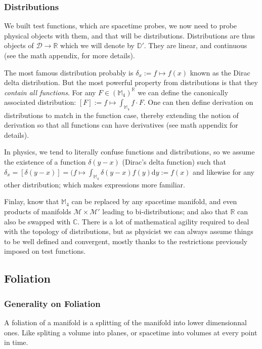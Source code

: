\documentclass[a4paper,11pt]{article}
\numberwithin{equation}{section}
\theoremstyle{definition}
\renewcommand{\d}{{\mathrm{d}}}
\begin{document}
\subsubsection{Distributions}
    We built test functions, which are spacetime probes, we now need to probe physical objects with them, and that will be distributions. Distributions are thus objects of $\mathcal{D}\to\mathbb{R}$ which we will denote by $\mathbb{D}'$. They are linear, and continuous (see the math appendix, for more details).

    The most famous distribution probably is $\delta_x:= f \mapsto f(x)$ known as the Dirac delta  distribution. 
    But the most powerful property from distributions is that they \emph{contain all functions}. For any $F\in (\mathbb{M}_4)^\mathbb{R}$ we can define the canonically associated distribution: $[F]:=f\mapsto\int_{\mathbb{M}_4} f\cdot F$. One can then define derivation on distributions to match in the function case, thereby extending the notion of derivation so that all functions can have derivatives (see math appendix for details).

    In physics, we tend to literally confuse functions and distributions, so we assume the existence of a function $\delta(y-x)$ (Dirac's delta function) such that $\delta_x=[\delta(y-x)]=(f\mapsto \int_{\mathbb{M}_4}\delta(y-x)f(y)\d y:=f(x)$ and likewise for any other distribution; which makes expressions more familiar.

    Finlay, know that $\mathbb{M}_4$ can be replaced by any spacetime manifold, and even products of manifolds $\mathcal{M}\times\mathcal{M}'$ leading to bi-distributions; and also that $\mathbb{R}$ can also be swapped with $\mathbb{C}$. There is a lot of mathematical agility required to deal with the topology of distributions, but as physicist we can always assume things to be well defined and convergent, mostly thanks to the restrictions previously imposed on test functions.

\subsection{Foliation}\label{PhyFoli}
    \subsubsection{Generality on Foliation}
    A foliation of a manifold is a splitting of the manifold into lower dimensionnal ones. Like spliting a volume into planes, or spacetime into volumes at every point in time.
\end{document}

